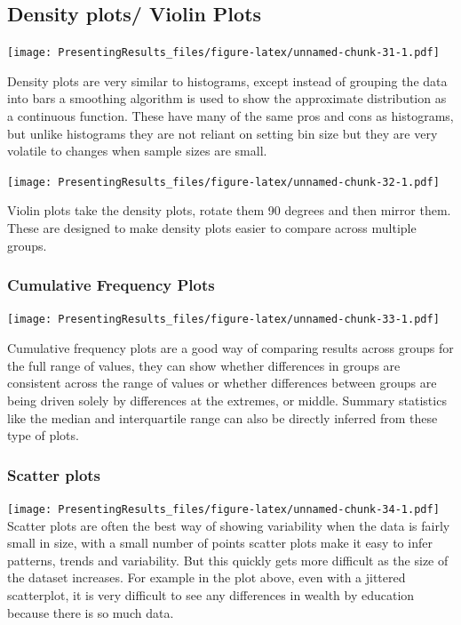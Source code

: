 \documentclass[
  titlepage]{book}
\begin{document}
\hypertarget{density-plots-violin-plots}{%
\subsection{Density plots/ Violin Plots}\label{density-plots-violin-plots}}

\texttt{[image: PresentingResults\_files/figure-latex/unnamed-chunk-31-1.pdf]}

Density plots are very similar to histograms, except instead of grouping the data into bars a smoothing algorithm is used to show the approximate distribution as a continuous function. These have many of the same pros and cons as histograms, but unlike histograms they are not reliant on setting bin size but they are very volatile to changes when sample sizes are small.

\texttt{[image: PresentingResults\_files/figure-latex/unnamed-chunk-32-1.pdf]}

Violin plots take the density plots, rotate them 90 degrees and then mirror them. These are designed to make density plots easier to compare across multiple groups.

\hypertarget{cumulative-frequency-plots}{%
\subsubsection{Cumulative Frequency Plots}\label{cumulative-frequency-plots}}

\texttt{[image: PresentingResults\_files/figure-latex/unnamed-chunk-33-1.pdf]}

Cumulative frequency plots are a good way of comparing results across groups for the full range of values, they can show whether differences in groups are consistent across the range of values or whether differences between groups are being driven solely by differences at the extremes, or middle. Summary statistics like the median and interquartile range can also be directly inferred from these type of plots.

\hypertarget{scatter-plots}{%
\subsubsection{Scatter plots}\label{scatter-plots}}

\texttt{[image: PresentingResults\_files/figure-latex/unnamed-chunk-34-1.pdf]}
Scatter plots are often the best way of showing variability when the data is fairly small in size, with a small number of points scatter plots make it easy to infer patterns, trends and variability. But this quickly gets more difficult as the size of the dataset increases. For example in the plot above, even with a jittered scatterplot, it is very difficult to see any differences in wealth by education because there is so much data.
\end{document}
